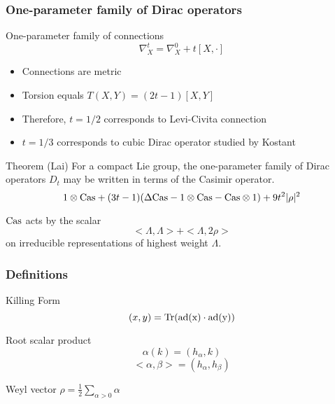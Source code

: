 \documentclass{beamer}
\def\Cas{{\rm Cas}}
\def\Tr{{\rm Tr}}
\begin{document}
\begin{frame}
  \frametitle{One-parameter family of Dirac operators}
  \begin{block}{One-parameter family of connections}
    \[
      \nabla_X^t = \nabla_X^0 + t[X, \cdot]
    \]
  \end{block}

  \pause

  \begin{block}{}
    \begin{itemize}
      \item Connections are metric
      \item Torsion equals $T(X,Y) = (2t-1)[X,Y]$
      \item Therefore, $t = 1/2$ corresponds to Levi-Civita connection
      \item $t = 1/3$ corresponds to cubic Dirac operator studied by Kostant
    \end{itemize}
  \end{block}
\end{frame}

\begin{frame}
  \begin{block}{Theorem (Lai)}
    For a compact Lie group, the one-parameter family of Dirac operators $D_t$ may be written in terms of the Casimir operator.
    \[
      1 \otimes \Cas + (3t-1)(\Delta \Cas - 1 \otimes \Cas - \Cas \otimes 1) + 9 t^2 |\rho|^2
    \]
  \end{block}

  \begin{block}{}
    $\Cas$ acts by the scalar 
    \[
    <\Lambda, \Lambda> + <\Lambda, 2 \rho>
    \]
    on irreducible representations of highest weight $\Lambda$.
  \end{block}
\end{frame}

\begin{frame}
	\frametitle{Definitions}
	\begin{block}{Killing Form}
	\[
	(x,y) = \Tr(\rm{ad}(x) \cdot \rm{ad}(y))
	\]
	\end{block}
	\begin{block}{Root scalar product}
	\[
	\alpha(k) = (h_{\alpha}, k)
	\]
	\[
	<\alpha, \beta> = (h_{\alpha}, h_{\beta})
	\]
	\end{block}
	\begin{block}{Weyl vector $\rho = \frac{1}{2} \sum_{\alpha > 0} \alpha$}
	\end{block}
\end{frame}
\end{document}
